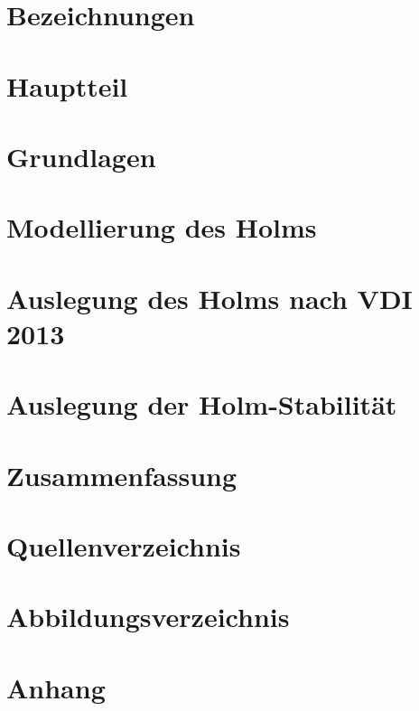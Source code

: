 \documentclass[a4paper,twoside,11pt]{article}
\begin{document}



\tableofcontents
\section{Bezeichnungen}

\section{Hauptteil}

\section{Grundlagen}

\section{Modellierung des Holms}

\section{Auslegung des Holms nach VDI 2013}

\section{Auslegung der Holm-Stabilität}

\section{Zusammenfassung}

\section{Quellenverzeichnis}

\section{Abbildungsverzeichnis}

\section{Anhang}

\end{document}
